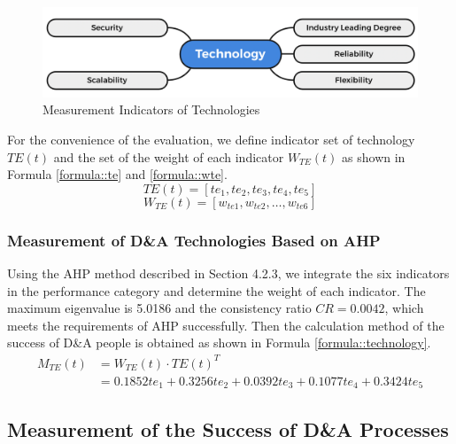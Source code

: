 \documentclass{mcmthesis}
\begin{document}
\begin{figure}[!htbp]
    \small
    \centering
    \includegraphics[width=12cm]{figures/IndicatorsofTechnology.png}
    \caption{Measurement Indicators of Technologies} 
    \label{figure::Measurement Indicators of Technologies}
\end{figure}%

For the convenience of the evaluation, we define indicator set of technology $TE(t)$ and the set of the weight of each indicator $W_{TE}(t)$ as shown in Formula \ref{formula::te} and \ref{formula::wte}.
\begin{equation}
    TE(t) = [te_1,te_2,te_3,te_4,te_5]
    \label{formula::te}
\end{equation}
\begin{equation}
    W_{TE}(t) = [w_{te1},w_{te2}, \dots ,w_{te6}]
    \label{formula::wte}
\end{equation}

\subsubsection{Measurement of D\&A Technologies Based on AHP}
Using the AHP method described in Section 4.2.3, we integrate the six indicators in the performance category and determine the weight of each indicator. The maximum eigenvalue is 5.0186 and the consistency ratio  $CR = 0.0042$, which meets the requirements of AHP successfully. Then the calculation method of the success of D\&A people is obtained as shown in Formula \ref{formula::technology}.
\begin{equation}
    \begin{split}
    M_{TE}(t) &= W_{TE}(t) \cdot TE(t)^T \\
              &= 0.1852te_1+0.3256te_2+0.0392te_3+0.1077te_4+0.3424te_5
    \end{split}
    \label{formula::technology}
\end{equation}


\subsection{Measurement of the Success of D\&A Processes}
\end{document}
